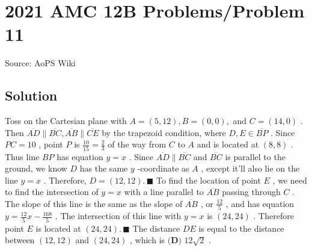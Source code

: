 \documentclass[12pt]{article}
\begin{document}
\section*{{2021 AMC 12B Problems/Problem 11}}
Source: AoPS Wiki

\subsection*{Solution}
Toss on the Cartesian plane with $A=(5, 12), B=(0, 0),$ and $C=(14, 0)$ . Then $\overline{AD}\parallel\overline{BC}, \overline{AB}\parallel\overline{CE}$ by the trapezoid condition, where $D, E\in\overline{BP}$ . Since $PC=10$ , point $P$ is $\tfrac{10}{15}=\tfrac{2}{3}$ of the way from $C$ to $A$ and is located at $(8, 8)$ . Thus line $BP$ has equation $y=x$ . Since $\overline{AD}\parallel\overline{BC}$ and $\overline{BC}$ is parallel to the ground, we know $D$ has the same $y$ -coordinate as $A$ , except it'll also lie on the line $y=x$ . Therefore, $D=(12, 12). \, \blacksquare$ To find the location of point $E$ , we need to find the intersection of $y=x$ with a line parallel to $\overline{AB}$ passing through $C$ . The slope of this line is the same as the slope of $\overline{AB}$ , or $\tfrac{12}{5}$ , and has equation $y=\tfrac{12}{5}x-\tfrac{168}{5}$ . The intersection of this line with $y=x$ is $(24, 24)$ . Therefore point $E$ is located at $(24, 24). \, \blacksquare$ The distance $DE$ is equal to the distance between $(12, 12)$ and $(24, 24)$ , which is $\boxed{\textbf{(D) }12\sqrt2}$ .
\end{document}
